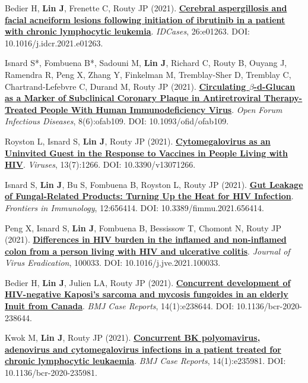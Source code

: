 \documentclass[letterpaper,11pt]{article}
\newcounter{journalCounter}
\newcommand{\jref}{%
    \stepcounter{journalCounter}%
    \textbf{[J.\thejournalCounter]}%
}
\begin{document}
\item[\jref] Bedier H, \textbf{Lin J}, Frenette C, Routy JP (2021). \href{https://doi.org/10.1016/j.idcr.2021.e01263}{\textbf{Cerebral aspergillosis and facial acneiform lesions following initiation of ibrutinib in a patient with chronic lymphocytic leukemia}}. \textit{IDCases}, 26:e01263. DOI: 10.1016/j.idcr.2021.e01263.

\item[\jref] Isnard S*, Fombuena B*, Sadouni M, \textbf{Lin J}, Richard C, Routy B, Ouyang J, Ramendra R, Peng X, Zhang Y, Finkelman M, Tremblay-Sher D, Tremblay C, Chartrand-Lefebvre C, Durand M, Routy JP (2021). \href{https://doi.org/10.1093/ofid/ofab109}{\textbf{Circulating $\beta$-d-Glucan as a Marker of Subclinical Coronary Plaque in Antiretroviral Therapy-Treated People With Human Immunodeficiency Virus}}. \textit{Open Forum Infectious Diseases}, 8(6):ofab109. DOI: 10.1093/ofid/ofab109.

\item[\jref] Royston L, Isnard S, \textbf{Lin J}, Routy JP (2021). \href{https://doi.org/10.3390/v13071266}{\textbf{Cytomegalovirus as an Uninvited Guest in the Response to Vaccines in People Living with HIV}}. \textit{Viruses}, 13(7):1266. DOI: 10.3390/v13071266.

\item[\jref] Isnard S, \textbf{Lin J}, Bu S, Fombuena B, Royston L, Routy JP (2021). \href{https://doi.org/10.3389/fimmu.2021.656414}{\textbf{Gut Leakage of Fungal‐Related Products: Turning Up the Heat for HIV Infection}}. \textit{Frontiers in Immunology}, 12:656414. DOI: 10.3389/fimmu.2021.656414.

\item[\jref] Peng X, Isnard S, \textbf{Lin J}, Fombuena B, Bessissow T, Chomont N, Routy JP (2021). \href{https://doi.org/10.1016/j.jve.2021.100033}{\textbf{Differences in HIV burden in the inflamed and non-inflamed colon from a person living with HIV and ulcerative colitis}}. \textit{Journal of Virus Eradication}, 100033. DOI: 10.1016/j.jve.2021.100033.

\item[\jref] Bedier H, \textbf{Lin J}, Julien LA, Routy JP (2021). \href{https://doi.org/10.1136/bcr-2020-238644}{\textbf{Concurrent development of HIV-negative Kaposi’s sarcoma and mycosis fungoides in an elderly Inuit from Canada}}. \textit{BMJ Case Reports}, 14(1):e238644. DOI: 10.1136/bcr-2020-238644.

\item[\jref] Kwok M, \textbf{Lin J}, Routy JP (2021). \href{https://doi.org/10.1136/bcr-2020-235981}{\textbf{Concurrent BK polyomavirus, adenovirus and cytomegalovirus infections in a patient treated for chronic lymphocytic leukaemia}}. \textit{BMJ Case Reports}, 14(1):e235981. DOI: 10.1136/bcr-2020-235981.
\end{document}
